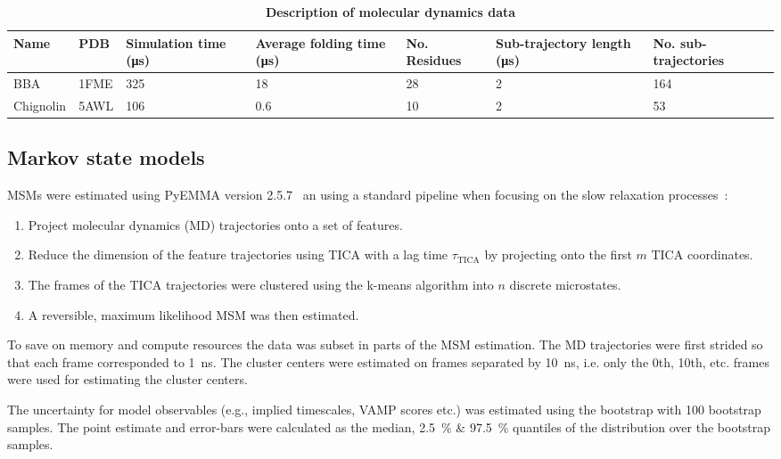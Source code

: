 \documentclass[journal=jacsat,manuscript=article]{achemso}
\begin{document}
\begin{table}
    \caption{\textbf{Description of molecular dynamics data}}
    \begin{tabularx}{\textwidth}{llXXXXX}
    \toprule
    Name & PDB & Simulation time (\si{\micro\second}) & Average folding time (\si{\micro\second}) & No. Residues & Sub-trajectory length (\si{\micro\second}) & No. sub-trajectories \\
    \midrule
    BBA                 & 1FME      & \num{325}     & \num{18}  & 28 & \num{2} & 164 \\
    Chignolin           & 5AWL    & \num{106}     & \num{0.6}  & 10 & 2 & 53 \\ 
    \bottomrule
    \end{tabularx}
    \label{tab:data_description}
\end{table}

\subsection{Markov state models}
MSMs were estimated using PyEMMA version 2.5.7~\cite{schererPyEMMASoftwarePackage2015a} an using a standard pipeline when focusing on the slow relaxation processes~\cite{noe_markov_2019, husic_markov_2018}: 
\begin{enumerate}
    \item Project molecular dynamics (MD) trajectories onto a set of features. 
    \item Reduce the dimension of the feature trajectories using TICA with a lag time $\tau_{\mathrm{TICA}}$ by projecting onto the first $m$ TICA coordinates. 
    \item The frames of the TICA trajectories were clustered using the k-means algorithm into $n$ discrete microstates. 
    \item A reversible, maximum likelihood MSM was then estimated. 
\end{enumerate}
To save on memory and compute resources  the data was subset in parts of the MSM estimation. The MD trajectories were first strided so that each frame corresponded to \SI{1}{\nano\second}. The cluster centers were estimated on frames separated by \SI{10}{\nano\second}, i.e. only the 0th, 10th, etc. frames were used for estimating the cluster centers. 

The uncertainty for model observables (e.g., implied timescales, VAMP scores etc.) was estimated using the bootstrap with \num{100} bootstrap samples. The point estimate and error-bars  were calculated as the median,   \SI{2.5}{\percent} \& \SI{97.5}{\percent} quantiles of the distribution over the bootstrap samples.
\end{document}
